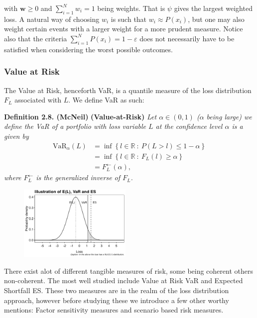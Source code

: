 \documentclass[a4paper,10pt,openany]{book}
\begin{document}
with \(\mathbf{w}\ge 0\) and \(\sum_{i=1}^Nw_i=1\) being weights. That is \(\psi\) gives the largest weighted loss. A natural way of choosing \(w_i\) is such that \(w_i\approx P(x_i)\), but one may also weight certain events with a larger weight for a more prudent measure. Notice also that the criteria \(\sum_{i=1}^N P(x_i)=1-\varepsilon\) does not necessarily have to be satisfied when considering the worst possible outcomes.

\hypertarget{value-at-risk}{%
\subsubsection{Value at Risk}\label{value-at-risk}}

The Value at Risk, henceforth VaR, is a quantile measure of the loss distribution \(F_L\) associated with \(L\). We define VaR as such:

\textbf{Definition 2.8. (McNeil)} \textbf{(Value-at-Risk)} \emph{Let \(\alpha\in (0,1)\) (\(\alpha\) being large) we define the VaR of a portfolio with loss variable \(L\) at the confidence level \(\alpha\) is a given by}
\begin{align*}
\text{VaR}_\alpha(L)&=\inf\left\{ l\in\mathbb{R}\ :\ P(L>l)\le 1-\alpha \right\}\\
&=\inf\left\{ l\in\mathbb{R}\ :\ F_L(l)\ge \alpha \right\}\\
&=F^{\leftarrow}_L(\alpha),
\end{align*}
\emph{where \(F^{\leftarrow}_L\) is the generalized inverse of \(F_L\).}

\begin{figure}
  \begin{center}
    \includegraphics[width=0.48\textwidth]{figures/VaR_ES.png}
  \end{center}
\end{figure}

There exist alot of different tangible measures of risk, some being coherent others non-coherent. The most well studied include Value at Risk VaR and Expected Shortfall ES. These two measures are in the realm of the loss distribution approach, however before studying these we introduce a few other worthy mentions: Factor sensitivity measures and scenario based risk measures.
\end{document}
